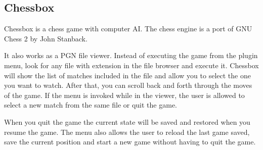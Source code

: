 \subsection{Chessbox}
Chessbox is a chess game with computer AI. The chess engine is a port of 
GNU Chess 2 by John Stanback.

It also works as a PGN file viewer. Instead of executing the game from the
plugin menu, look for any file with  extension in the file browser
and execute it. Chessbox will show the list of matches included in the file
and allow you to select the one you want to watch. After that, you can scroll
back and forth through the moves of the game. If the menu is invoked while in
the viewer, the user is allowed to select a new match from the same file or
quit the game.

When you quit the game the current state will be saved and restored when
you resume the game. The menu also allows the user to reload the last game
saved, save the current position and start a new game without having to quit
the game.



